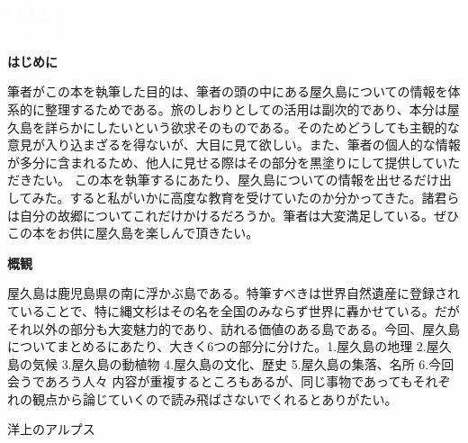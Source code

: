 \documentclass[10pt,titlepage,a5paper]{ltjsbook}
\begin{document}
  \begin{titlepage}
    \centering
    \\
    \vspace{10em}
    \textcolor{white}{\fontsize{36pt}{40pt}\selectfont \textbf{屋久島考}} \\
    \vspace{2em}
    \textcolor{white}{\Large{中村佳介}}\\
    \vspace{2em}
  \end{titlepage}
  \thispagestyle{empty}
  \begin{center}
    \textbf{\huge{はじめに}}\\
  \end{center}
  \vspace{2em}

    筆者がこの本を執筆した目的は、筆者の頭の中にある屋久島についての情報を体系的に整理するためである。旅のしおりとしての活用は副次的であり、本分は屋久島を詳らかにしたいという欲求そのものである。そのためどうしても主観的な意見が入り込まざるを得ないが、大目に見て欲しい。また、筆者の個人的な情報が多分に含まれるため、他人に見せる際はその部分を黒塗りにして提供していただきたい。
    この本を執筆するにあたり、屋久島についての情報を出せるだけ出してみた。すると私がいかに高度な教育を受けていたのか分かってきた。諸君らは自分の故郷についてこれだけかけるだろうか。筆者は大変満足している。ぜひこの本をお供に屋久島を楽しんで頂きたい。
  \vspace{4em}
  \begin{center}
    \textbf{\huge{概観}}\\
  \end{center}
  \vspace{2em}

  屋久島は鹿児島県の南に浮かぶ島である。特筆すべきは世界自然遺産に登録されていることで、特に縄文杉はその名を全国のみならず世界に轟かせている。だがそれ以外の部分も大変魅力的であり、訪れる価値のある島である。今回、屋久島についてまとめるにあたり、大きく6つの部分に分けた。1.屋久島の地理 2.屋久島の気候 3.屋久島の動植物 4.屋久島の文化、歴史 5.屋久島の集落、名所 6.今回会うであろう人々
  内容が重複するところもあるが、同じ事物であってもそれぞれの観点から論じていくので読み飛ばさないでくれるとありがたい。
  {
  \thispagestyle{empty}
  \tableofcontents
  \thispagestyle{empty}
  \setcounter{page}{0}
  }
  \begin{savequote}
    洋上のアルプス  
  \end{savequote}
\end{document}
